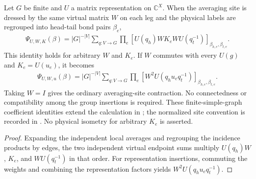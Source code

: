 \begin{lemma}%
    \label{thm:peps_graph_inserted_averaging_bond_state}
    \leanok
    Let $G$ be finite and $U$ a matrix representation on $\mathbb C^X$.
    When the averaging site is dressed by the same virtual matrix $W$ on each
    leg and the physical labels are regrouped into head-tail bond pairs $\beta_e$,
    \begin{align}
        \Psi_{U,W,K}(\beta)
        =|G|^{-|V|}\sum_{q:V\to G}
        \prod_e
        [U(q_h)WK_eWU(q_t^{-1})]_{\beta_{h,e},\beta_{t,e}}.
    \end{align}
    This identity holds for arbitrary $W$ and $K_e$.
    If $W$ commutes with every $U(g)$ and $K_e=U(u_e)$, it becomes
    \begin{align}
        \Psi_{U,W,u}(\beta)
        =|G|^{-|V|}\sum_{q:V\to G}
        \prod_e[W^2U(q_hu_eq_t^{-1})]_{\beta_{h,e},\beta_{t,e}}.
    \end{align}
    Taking $W=I$ gives the ordinary averaging-site contraction.
    No connectedness or compatibility among the group insertions is required.
    These finite-simple-graph coefficient identities extend the calculation in
    \cite[Section~7]{Schuch2010PEPS}; the normalized site convention is recorded
    in \cite{gap:rmp_peps_quantum_double_g_isometry}.
    No physical isometry for arbitrary $K_e$ is asserted.
\end{lemma}

\begin{proof}\leanok
    Expanding the independent local averages and regrouping the incidence products
    by edges, the two independent virtual endpoint sums multiply
    $U(q_h)W$, $K_e$, and $WU(q_t^{-1})$ in that order.
    For representation insertions, commuting the weights and combining the
    representation factors yields $W^2U(q_hu_eq_t^{-1})$.
\end{proof}
